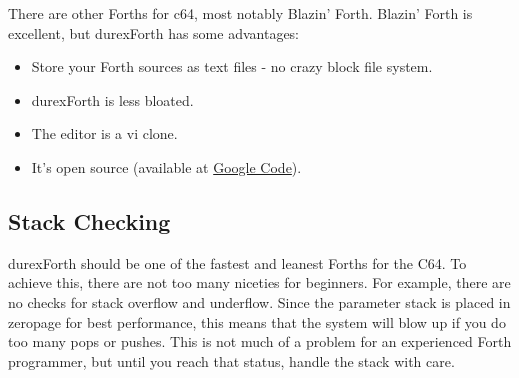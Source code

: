 There are other Forths for c64, most notably Blazin' Forth. Blazin' Forth is excellent, but durexForth has some advantages:

\begin{itemize}
\item Store your Forth sources as text files - no crazy block file system.
\item durexForth is less bloated.
\item The editor is a vi clone.
\item It's open source (available at \href{http://code.google.com/p/durexforth/}{Google Code}).
\end{itemize}


\subsection{Stack Checking}

durexForth should be one of the fastest and leanest Forths for the C64. To achieve this, there are not too many niceties for beginners. For example, there are no checks for stack overflow and underflow. Since the parameter stack is placed in zeropage for best performance, this means that the system will blow up if you do too many pops or pushes. This is not much of a problem for an experienced Forth programmer, but until you reach that status, handle the stack with care.

